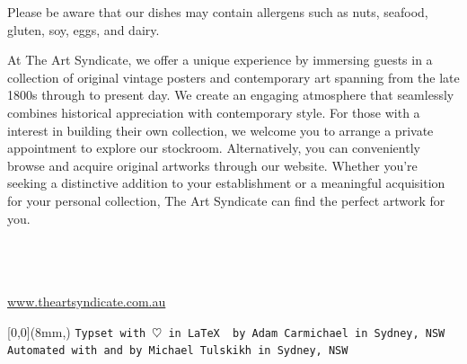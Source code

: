 \documentclass[
    pdflatex,
    fontsize=8pt,
    draft=true,
    twoside
]{article}
\begin{document}
\newpage


\newpage

Please be aware that our dishes may contain allergens such as nuts,
seafood, gluten, soy, eggs, and dairy.

\newpage
At The Art Syndicate, we offer a unique experience by immersing guests in a collection of original vintage posters and contemporary art spanning from the late 1800s through to present day. We create an engaging atmosphere that seamlessly combines historical appreciation with contemporary style. For those with a interest in building their own collection, we welcome you to arrange a private appointment to explore our stockroom. Alternatively, you can conveniently browse and acquire original artworks through our website. Whether you're seeking a distinctive addition to your establishment or a meaningful acquisition for your personal collection, The Art Syndicate can find the perfect artwork for you.
\\~\\
\begin{center}
    \\~\\
    \url{www.theartsyndicate.com.au}
\end{center}
\fancyfoot[R]{\footnotesize\DTMnow}
\begin{textblock*}{\linewidth}[0,0](8mm,\dimexpr\paperheight-20mm\relax)
    \footnotesize{
        \texttt{Typset with $\heartsuit$ in \LaTeX~ by Adam Carmichael in Sydney, NSW}
    }\\
    \footnotesize{
        \texttt{Automated with  and  by Michael Tulskikh in Sydney, NSW}
    }
\end{textblock*}
\end{document}
